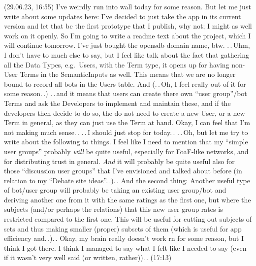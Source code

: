 \documentclass{report}
\begin{document}
(29.06.23, 16:55) I've weirdly run into wall today for some reason. But let me just write about some updates here: I've decided to just take the app in its current version and let that be the first prototype that I publish, why not; I might as well work on it openly. So I'm going to write a readme text about the project, which I will continue tomorrow. I've just bought the opensdb domain name, btw. .\,.\,Uhm, I don't have to much else to say, but I feel like talk about the fact that gathering all the Data Types, e.g.\ Users, with the Term type, it opens up for having non-User Terms in the SemanticInputs as well. This means that we are no longer bound to record all bots in the Users table. And (.\,.\,Oh, I feel really out of it for some reason.\,.) .\,.\,and it means that users can create there own ``user group''/bot Terms and ask the Developers to implement and maintain these, and if the developers then decide to do so, the do not need to create a new User, or a new Term in general, as they can just use the Term at hand. Okay, I can feel that I'm not making much sense.\,. .\,.\,I should just stop for today.\,. .\,.\,Oh, but let me try to write about the following to things. I feel like I need to mention that my ``simple user groups'' probably \emph{will} be quite useful, especially for FoaF-like networks, and for distributing trust in general. \emph{And} it will probably be quite useful also for those ``discussion user groups'' that I've envisioned and talked about before (in relation to my ``Debate site ideas''.\,.).\,. And the second thing: Another useful type of bot/user group will probably be taking an existing user group/bot and deriving another one from it with the same ratings as the first one, but where the subjects (and/or perhaps the relations) that this new user group rates is restricted compared to the first one. This will be useful for cutting out subjects of sets and thus making smaller (proper) subsets of them (which is useful for app efficiency and.\,.).\,. Okay, my brain really doesn't work rn for some reason, but I think I got there. I think I managed to say what I felt like I needed to say (even if it wasn't very well said (or written, rather)).\,. (17:13)
\end{document}
